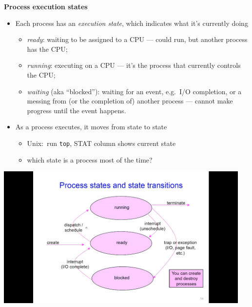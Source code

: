\documentclass[11pt,a4paper]{article}
\begin{document}
\textbf{Process execution states}
\begin{itemize}
    \item Each process has an \emph{execution state}, which indicates what it's currently doing
        \begin{itemize}
            \item \emph{ready}: waiting to be assigned to a CPU ---
                could run, but another process has the CPU;\
            \item \emph{running}: executing on a CPU ---
                it's the process that currently controls the CPU;\
            \item \emph{waiting} (aka ``blocked''): waiting for an event, e.g.\ I/O completion,
                or a messing from (or the completion of) another process ---
                cannot make progress until the event happens.
        \end{itemize}
    \item As a process executes, it moves from state to state
        \begin{itemize}
            \item Unix:\ run \texttt{top}, STAT column shows current state
            \item which state is a process most of the time?
        \end{itemize}
\end{itemize}

\includegraphics[height=270]{process-states-and-state-transitions.jpg}
\end{document}
